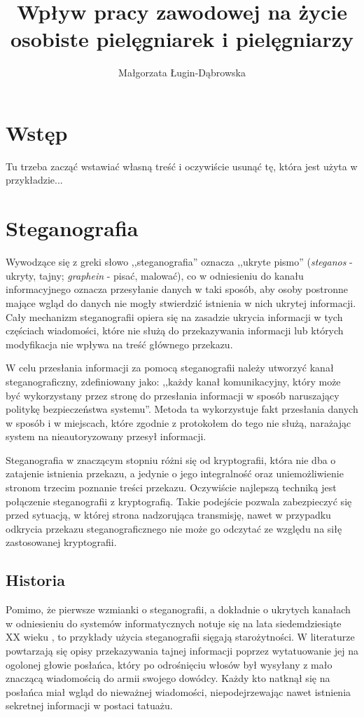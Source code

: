 \documentclass[a4paper,12pt,twoside,openany]{report}
\title{Wpływ pracy zawodowej na życie osobiste pielęgniarek i pielęgniarzy}
\author{Małgorzata Ługin-Dąbrowska}
\begin{document}
\maketitle

\chapter{Wstęp}
Tu trzeba zacząć wstawiać własną treść i oczywiście usunąć tę, która jest użyta w przykładzie...



\chapter{Steganografia}
Wywodzące się z greki słowo ,,steganografia'' oznacza ,,ukryte pismo'' 
(\textit{steganos} - ukryty, tajny; \textit{graphein} - pisać, malować), co w 
odniesieniu do kanału informacyjnego oznacza przesyłanie danych w taki sposób, 
aby osoby postronne mające wgląd do danych nie mogły stwierdzić istnienia w nich 
ukrytej informacji. Cały mechanizm steganografii opiera się na zasadzie ukrycia 
informacji w tych częściach wiadomości, które nie służą do przekazywania 
informacji lub których modyfikacja nie wpływa na treść głównego przekazu.

W celu przesłania informacji za pomocą steganografii należy utworzyć kanał 
steganograficzny, zdefiniowany \cite{USDoD}  jako: ,,każdy kanał komunikacyjny, 
który może być wykorzystany przez stronę do przesłania informacji w sposób 
naruszający politykę bezpieczeństwa systemu''. Metoda ta wykorzystuje fakt 
przesłania danych w sposób i w miejscach, które zgodnie z protokołem do tego nie 
służą, narażając system na nieautoryzowany przesył informacji.

Steganografia w znaczącym stopniu różni się od kryptografii, która nie dba o 
zatajenie istnienia przekazu, a jedynie o jego integralność oraz uniemożliwienie 
stronom trzecim poznanie treści przekazu. Oczywiście najlepszą techniką jest 
połączenie steganografii z kryptografią. Takie podejście pozwala zabezpieczyć 
się przed sytuacją, w której strona nadzorująca transmisję, nawet w przypadku 
odkrycia przekazu steganograficznego nie może go odczytać ze względu na siłę 
zastosowanej kryptografii.
\section{Historia}
Pomimo, że pierwsze wzmianki o steganografii, a dokładnie o ukrytych kanałach w \cite{X1}
odniesieniu do systemów informatycznych notuje się na lata siedemdziesiąte XX 
wieku \cite{FirstCC}, to przykłady użycia steganografii sięgają starożytności. W 
literaturze powtarzają się opisy przekazywania tajnej informacji poprzez 
wytatuowanie jej na ogolonej głowie posłańca, który po odrośnięciu włosów był 
wysyłany z mało znaczącą wiadomością do armii swojego dowódcy. Każdy kto natknął 
się na posłańca miał wgląd do nieważnej wiadomości, niepodejrzewając nawet 
istnienia sekretnej informacji w postaci tatuażu.
\end{document}
